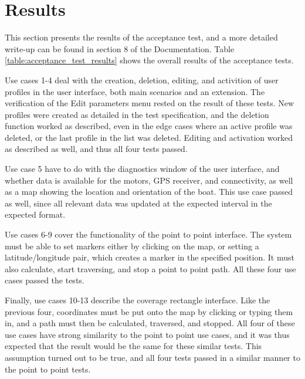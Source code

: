 \chapter{Results}
This section presents the results of the acceptance test, and a more detailed write-up can be found in section 8 of the Documentation. Table \ref{table:acceptance_test_results} shows the overall results of the acceptance tests.

Use cases 1-4 deal with the creation, deletion, editing, and activition of user profiles in the user interface, both main scenarios and an extension. The verification of the Edit parameters menu rested on the result of these tests. New profiles were created as detailed in the test specification, and the deletion function worked as described, even in the edge cases where an active profile was deleted, or the last profile in the list was deleted. Editing and activation worked as described as well, and thus all four tests passed. 

Use case 5 have to do with the diagnostics window of the user interface, and whether data is available for the motors, GPS receiver, and connectivity, as well as a map showing the location and orientation of the boat. This use case passed as well, since all relevant data was updated at the expected interval in the expected format.

Use cases 6-9 cover the functionality of the point to point interface. The system must be able to set markers either by clicking on the map, or setting a latitude/longitude pair, which creates a marker in the specified position. It must also calculate, start traversing, and stop a point to point path. All these four use cases passed the tests.

Finally, use cases 10-13 describe the coverage rectangle interface. Like the previous four, coordinates must be put onto the map by clicking or typing them in, and a path must then be calculated, traversed, and stopped. All four of these use cases have strong similarity to the point to point use cases, and it was thus expected that the result would be the same for these similar tests. This assumption turned out to be true, and all four tests passed in a similar manner to the point to point tests.

